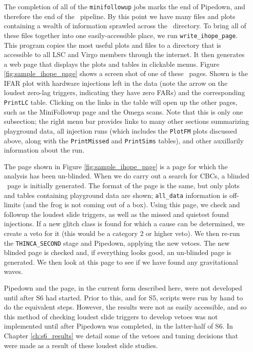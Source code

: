 The completion of all of the \texttt{minifollowup} jobs marks the end of
Pipedown, and therefore the end of the \ihope~pipeline. By this point we have
many files and plots containing a wealth of information sprawled across the
\ihope~directory. To bring all of these files together into one
easily-accessible place, we run \verb|write_ihope_page|. This program copies
the most useful plots and files to a directory that is accessible to all
\ac{LSC} and Virgo members through the internet. It then generates a web page
that displays the plots and tables in clickable menus. Figure
\ref{fig:sample_ihope_page} shows a screen shot of one of these \ihope~pages.
Shown is the IFAR plot with hardware injections left in the data (note the
arrow on the loudest zero-lag triggers, indicating they have zero \acp{FAR})
and the corresponding \texttt{PrintLC} table. Clicking on the links in the
table will open up the other pages, such as the MiniFollowup page and the Omega
scans. Note that this is only one subsection; the right menu bar provides links
to many other sections summarizing playground data, all injection runs (which
includes the \texttt{PlotFM} plots discussed above, along with the
\texttt{PrintMissed} and \texttt{PrintSims} tables), and other auxillarily
information about the run.

The page shown in Figure \ref{fig:sample_ihope_page} is a page for which the
analysis has been un-blinded. When we do carry out a search for \acp{CBC}, a
blinded \ihope~page is initially generated. The format of the page is the same,
but only plots and tables containing playground data are shown; \verb|all_data|
information is off-limits (and the frog is not coming out of a box). Using this
page, we check and followup the loudest slide triggers, as well as the missed
and quietest found injections. If a new glitch class is found for which a cause
can be determined, we create a veto for it (this would be a category 2 or
higher veto). We then re-run the \verb|THINCA_SECOND| stage and Pipedown,
applying the new vetoes. The new blinded page is checked and, if everything
looks good, an un-blinded page is generated. We then look at this page to see
if we have found any gravitational waves.

Pipedown and the \ihope page, in the current form described here, were not
developed until after \ac{S6} had started. Prior to this, and for \ac{S5},
scripts were run by hand to do the equivalent steps. However, the results were
not as easily accessible, and so this method of checking loudest slide triggers
to develop vetoes was not implemented until after Pipedown was completed, in
the latter-half of \ac{S6}. In Chapter \ref{ch:s6_results} we detail some of
the vetoes and tuning decisions that were made as a result of these loudest
slide studies.

